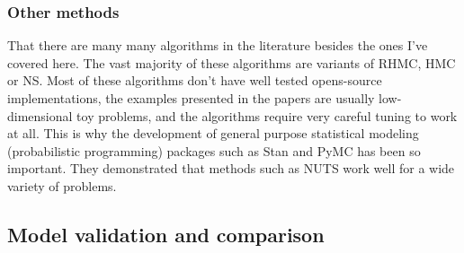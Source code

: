 \documentclass[12pt,dvipsnames]{report}
\newcommand{\ssf}[1]{\textsf{#1}}
\begin{document}
\subsubsection{Other methods}
That there are many many algorithms in the  literature besides the ones I've covered here. 
The vast majority of these  algorithms are variants of RHMC, HMC or  
NS. Most of these algorithms don't have well tested opens-source implementations, 
the examples presented in the papers are usually low-dimensional toy 
problems, and the algorithms require very careful tuning to work at all. This 
is why the development of general purpose statistical modeling 
(probabilistic programming) packages such as \ssf{Stan} and 
\ssf{PyMC} has been so important. They demonstrated that methods such as 
NUTS work well for a wide variety of problems.

\subsection{Model validation and comparison}
\label{ssec:model_comparison}
\end{document}
